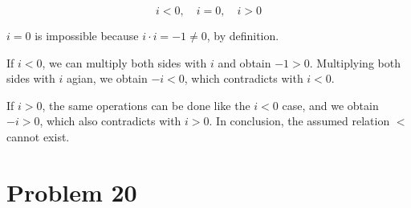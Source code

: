 \documentclass{scrartcl}
\begin{document}
\[
  i < 0, \quad i = 0, \quad i > 0
\]

\(i = 0\) is impossible because \(i \cdot i = -1 \not = 0\), by definition.

If \(i < 0\), we can multiply both sides with \(i\) and obtain \(-1 > 0\).
Multiplying both sides with \(i\) agian, we obtain \(-i < 0\), which contradicts with \(i < 0\).

If \(i > 0\), the same operations can be done like the \(i < 0\) case, and we obtain \(-i > 0\), which also contradicts with \(i > 0\).
In conclusion, the assumed relation \(<\) cannot exist.

\section{Problem 20}
\end{document}
